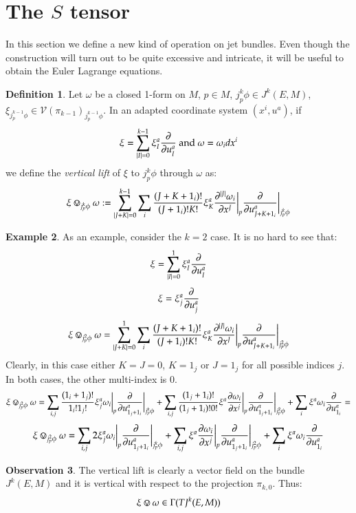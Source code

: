 \documentclass[12pt,a4paper]{report}
\theoremstyle{definition}
\newtheorem{Def}{Definition}[chapter]
\theoremstyle{Theorem}
\theoremstyle{break}
\newtheorem{Ex}[Def]{Example}
\theoremstyle{definition}
\newtheorem{Obs}[Def]{Observation}
\begin{document}
		\section{The $S$ tensor}
		In this section we define a new kind of operation on jet bundles. Even though the construction will turn out to be quite excessive and intricate, it will be useful to obtain the Euler Lagrange equations. 
		\begin{Def}
			Let $\omega$ be a closed 1-form on $M$, $p\in M$, $j^k_p\phi\in J^k(E,M)$, $\xi_{j^{k-1}_p\phi}\in\mathcal{V}(\pi_{k-1})_{j^{k-1}_p\phi}$. In an adapted coordinate system $(x^i,u^a)$, if
			$$\xi=\sum_{|I|=0}^{k-1}\xi_I^a{\partial\over \partial u^a_I}\hbox{  and  }\omega=\omega_idx^i$$
			we define the \textit{vertical lift} of $\xi$ to $j^k_p\phi$ through $\omega$ as:
			$$\xi\circledvee_{j^k_p\phi}\omega:=\sum_{|J+K|=0}^{k-1}\sum_i{(J+K+1_i)!\over (J+1_i)!K!}\xi_K^a{\partial^{|J|} \omega_i\over \partial x^J}\bigg|_p{\partial\over \partial u^a_{J+K+1_i}}\bigg|_{j^k_p\phi}$$
		\end{Def}
		\begin{Ex}
			As an example, consider the $k=2$ case. It is no hard to see that:
			$$\xi=\sum_{|I|=0}^{1}\xi_I^a{\partial\over \partial u^a_I}$$
			$$\xi=\xi_j^a{\partial\over \partial u^a_j}$$
			$$\xi\circledvee_{j^2_p\phi}\omega=\sum_{|J+K|=0}^{1}\sum_i{(J+K+1_i)!\over (J+1_i)!K!}\xi_K^a{\partial^{|J|} \omega_i\over \partial x^J}\bigg|_p{\partial\over \partial u^a_{J+K+1_i}}\bigg|_{j^2_p\phi}$$
			Clearly, in this case either $K=J=0$, $K=1_j$ or $J=1_j$ for all possible indices $j$. In both cases, the other multi-index is 0.
			$$\xi\circledvee_{j^2_p\phi}\omega=\sum_{i,j}{(1_i+1_j)!\over 1_i!1_j!}\xi_j^a \omega_i\bigg|_p{\partial\over \partial u^a_{1_j+1_i}}\bigg|_{j^k_p\phi}+\sum_{i,j}{(1_j+1_i)!\over (1_j+1_i)!0!}\xi^a{\partial \omega_i\over \partial x^j}\bigg|_p{\partial\over \partial u^a_{1_j+1_i}}\bigg|_{j^2_p\phi}+\sum_i\xi^a\omega_i{\partial\over \partial u^a_{1_i}}=$$
			$$\xi\circledvee_{j^2_p\phi}\omega=\sum_{i,j}{2}\xi_j^a \omega_i\bigg|_p{\partial\over \partial u^a_{1_j+1_i}}\bigg|_{j^k_p\phi}+\sum_{i,j}\xi^a{\partial \omega_i\over \partial x^j}\bigg|_p{\partial\over \partial u^a_{1_j+1_i}}\bigg|_{j^2_p\phi}+\sum_i\xi^a\omega_i{\partial\over \partial u^a_{1_i}}$$
		\end{Ex}
		\begin{Obs}
			The vertical lift is clearly a vector field on the bundle $J^k(E,M)$ and it is vertical with respect to the projection $\pi_{k,0}$. Thus:
			$$\xi\circledvee \omega\in \Gamma(TJ^k(E,M))$$
		\end{Obs}
\end{document}
